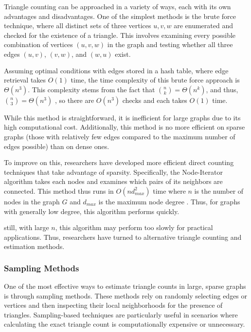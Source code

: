 \documentclass[11pt, margin=1in]{article}
\begin{document}
Triangle counting can be approached in a variety of ways, each with its own advantages and disadvantages. 
One of the simplest methods is the brute force technique, where all distinct sets of three vertices ${u, v, w}$ are enumerated and checked for the existence of a triangle.
This involves examining every possible combination of vertices $(u, v, w)$ in the graph and testing whether all three edges $(u, v)$, $(v, w)$, and $(w, u)$ exist. 

Assuming optimal conditions with edges stored in a hash table, where edge retrieval takes $O(1)$ time, the time complexity of this brute force approach is $\Theta(n^3)$. 
This complexity stems from the fact that ${n \choose k} = \Theta(n^k)$, and thus, ${n \choose 3} = \Theta(n^3)$ \cite{al_hasan_triangle_2018}, so there are $O(n^3)$ checks and each takes $O(1)$ time. 

While this method is straightforward, it is inefficient for large graphs due to its high computational cost.
Additionally, this method is no more efficient on sparse graphs (those with relatively few edges compared to the maximum number of edges possible) than on dense ones.

To improve on this, researchers have developed more efficient direct counting techniques that take advantage of sparsity.
Specifically, the Node-Iterator \cite{schank_finding_2005} algorithm takes each nodes and examines which pairs of its neighbors are connected.
This method thus runs in $O(nd^2_{max})$ time where $n$ is the number of nodes in the graph $G$ and $d_{max}$ is the maximum node degree \cite{schank_finding_2005}.
Thus, for graphs with generally low degree, this algorithm performs quickly.

still, with large $n$, this algorithm may perform too slowly for practical applications.
Thus, researchers have turned to alternative triangle counting and estimation methods.

\subsubsection{Sampling Methods}

One of the most effective ways to estimate triangle counts in large, sparse graphs is through sampling methods.
These methods rely on randomly selecting edges or vertices and then inspecting their local neighborhoods for the presence of triangles.
Sampling-based techniques are particularly useful in scenarios where calculating the exact triangle count is computationally expensive or unnecessary.
\end{document}
